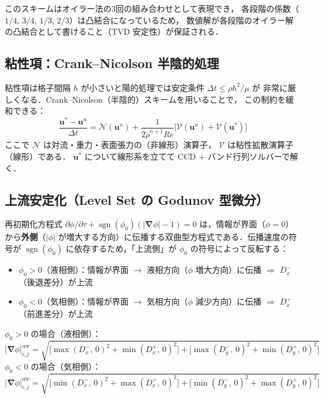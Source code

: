 \documentclass[12pt, a4paper, titlepage]{article}
\newcommand{\jp}[1]{{\normalfont\jpfont #1}}
\newcommand{\bu}{\bm{u}}
\newcommand{\bnabla}{\bm{\nabla}}
\begin{document}
\jp{このスキームはオイラー法の3回の組み合わせとして表現でき，
各段階の係数（$1/4$, $3/4$, $1/3$, $2/3$）は凸結合になっているため，
数値解が各段階のオイラー解の凸結合として書けること（TVD 安定性）が保証される．}

\subsection{\jp{粘性項：Crank--Nicolson 半陰的処理}}

\jp{粘性項は格子間隔 $h$ が小さいと陽的処理では安定条件 $\Delta t \leq \rho h^2/\mu$ が
非常に厳しくなる．Crank--Nicolson（半陰的）スキームを用いることで，
この制約を緩和できる：}
\begin{equation}
  \frac{\bu^* - \bu^n}{\Delta t}
  = \mathcal{N}(\bu^n)
  + \frac{1}{2\tilde\rho^{n+1} Re}\bigl[\mathcal{V}(\bu^n) + \mathcal{V}(\bu^*)\bigr]
  \label{eq:CN}
\end{equation}
\jp{ここで $\mathcal{N}$ は対流・重力・表面張力の（非線形）演算子，
$\mathcal{V}$ は粘性拡散演算子（線形）である．
$\bu^*$ について線形系を立てて CCD + バンド行列ソルバーで解く．}

\subsection{\jp{上流安定化（Level Set の Godunov 型微分）}}
\label{sec:upstream}

\jp{再初期化方程式 $\partial\phi/\partial\tau + \operatorname{sgn}(\phi_0)(|\bnabla\phi|-1)=0$ は，情報が界面（$\phi=0$）から\textbf{外側}（$|\phi|$ が増大する方向）に伝播する双曲型方程式である．伝播速度の符号が $\operatorname{sgn}(\phi_0)$ に依存するため，「上流側」が $\phi_0$ の符号によって反転する：}
\begin{itemize}
  \item \jp{$\phi_0 > 0$（液相側）：情報が界面 $\to$ 液相方向（$\phi$ 増大方向）に伝播 $\Rightarrow$ $D^-_x$（後退差分）が上流}
  \item \jp{$\phi_0 < 0$（気相側）：情報が界面 $\to$ 気相方向（$\phi$ 減少方向）に伝播 $\Rightarrow$ $D^+_x$（前進差分）が上流}
\end{itemize}

\begin{tcolorbox}[mybox, title={Godunov \jp{型上流勾配（$\phi_0$ 符号依存，2次元）}}]
\jp{$\phi_0 > 0$ の場合（液相側）：}
\begin{equation}
  |\bnabla\phi|^{\mathrm{uw}}_{i,j} =
  \sqrt{
    \bigl[\max(D^-_x,\,0)^2 + \min(D^+_x,\,0)^2\bigr]
    +
    \bigl[\max(D^-_y,\,0)^2 + \min(D^+_y,\,0)^2\bigr]
  }
  \label{eq:godunov_pos}
\end{equation}
\jp{$\phi_0 < 0$ の場合（気相側）：}
\begin{equation}
  |\bnabla\phi|^{\mathrm{uw}}_{i,j} =
  \sqrt{
    \bigl[\min(D^-_x,\,0)^2 + \max(D^+_x,\,0)^2\bigr]
    +
    \bigl[\min(D^-_y,\,0)^2 + \max(D^+_y,\,0)^2\bigr]
  }
  \label{eq:godunov_neg}
\end{equation}
\end{tcolorbox}
\end{document}

